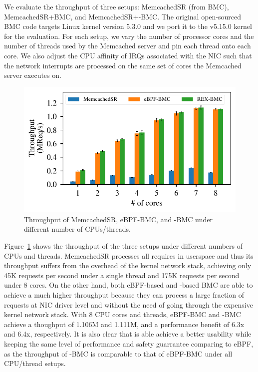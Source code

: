 We evaluate the throughput of three setups: MemcachedSR (from BMC),
    MemcachedSR+BMC, and MemcachedSR+\projname{}-BMC.
The original open-sourced BMC code targets Linux kernel version 5.3.0 and we
    port it to the v5.15.0 \projname{} kernel for the evaluation.
For each setup, we vary the number of processor cores and the number of threads
    used by the Memcached server and pin each thread onto each core.
We also adjust the CPU affinity of IRQs associated with the NIC such that the
    network interrupts are processed on the same set of cores the Memcached
    server executes on.

\begin{figure}[t]
    \includegraphics[width=1.0\linewidth]{figs/bmc.pdf}
    \centering
    \vspace{-25pt}
    \caption{Throughput of MemcachedSR, eBPF-BMC, and \projname{}-BMC
        under different number of CPUs/threads.
    }
    \label{fig:eval-bmc}
    \vspace{-12pt}
\end{figure}

Figure~\ref{fig:eval-bmc} shows the throughput of the three setups under
    different numbers of CPUs and threads.
MemcachedSR processes all requires in userspace and thus its throughput suffers
    from the overhead of the kernel network stack, achieving only 45K requests
    per second under a single thread and 175K requests per second under 8
    cores.
On the other hand, both eBPF-based and \projname{}-based BMC are able to
    achieve a much higher throughput because they can process a large
    fraction of requests at NIC driver level and without the need of going through
    the expensive kernel network stack.
With 8 CPU cores and threads, eBPF-BMC and \projname{}-BMC achieve a thoughput
    of 1.106M and 1.111M, and a performance benefit of 6.3x and 6.4x,
    respectively.
It is also clear that \projname{} is able achieve a better usability while
    keeping the same level of performance and safety guarrantee comparing to
    eBPF,  as the throughput of \projname{}-BMC is comparable to that of
    eBPF-BMC under all CPU/thread setups.

